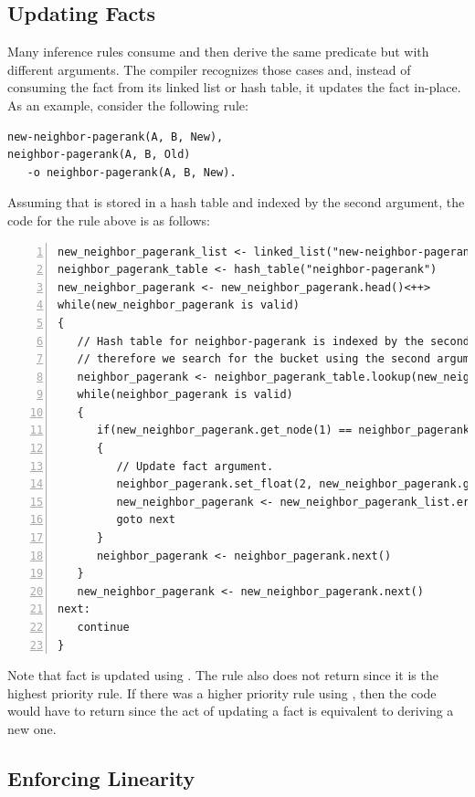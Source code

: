 \subsection{Updating Facts}

Many inference rules consume and then derive the same predicate but with
different arguments. The compiler recognizes those cases and, instead of
consuming the fact from its linked list or hash table, it updates the fact
in-place. As an example, consider the following rule:

\begin{Verbatim}[fontsize=\codesize]
new-neighbor-pagerank(A, B, New),
neighbor-pagerank(A, B, Old)
   -o neighbor-pagerank(A, B, New).
\end{Verbatim}

Assuming that  is stored in a hash table and indexed by
the second argument, the code for the rule above is as follows:

\begin{Verbatim}[numbers=left,fontsize=\codesize]
new_neighbor_pagerank_list <- linked_list("new-neighbor-pagerank")
neighbor_pagerank_table <- hash_table("neighbor-pagerank")
new_neighbor_pagerank <- new_neighbor_pagerank.head()<++>
while(new_neighbor_pagerank is valid)
{
   // Hash table for neighbor-pagerank is indexed by the second argument,
   // therefore we search for the bucket using the second argument of new-neighbor-pagerank.
   neighbor_pagerank <- neighbor_pagerank_table.lookup(new_neighbor_pagerank.get_node(1))
   while(neighbor_pagerank is valid)
   {
      if(new_neighbor_pagerank.get_node(1) == neighbor_pagerank.get_node(1))
      {
         // Update fact argument.
         neighbor_pagerank.set_float(2, new_neighbor_pagerank.get_float(2))
         new_neighbor_pagerank <- new_neighbor_pagerank_list.erase(new_neighbor_pagerank)
         goto next
      }
      neighbor_pagerank <- neighbor_pagerank.next()
   }
   new_neighbor_pagerank <- new_neighbor_pagerank.next()
next:
   continue
}
\end{Verbatim}

Note that  fact is updated using . The
rule also does not return since it is the highest priority rule. If there was a
higher priority rule using , then the code would have to
return since the act of updating a fact is equivalent to deriving a new one.

\subsection{Enforcing Linearity}

